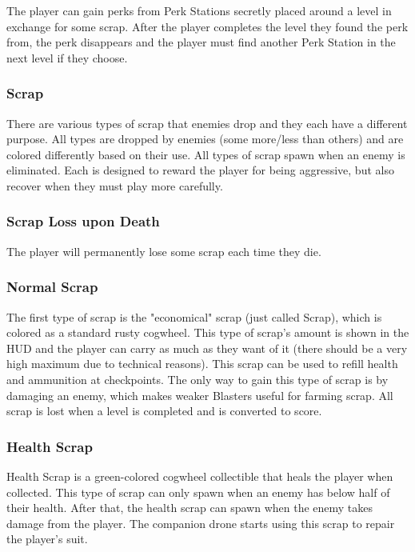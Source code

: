 \documentclass[12pt]{article}
\begin{document}
The player can gain perks from Perk Stations secretly placed around a level in exchange for some scrap. After the player completes the level they found the perk from, the perk disappears and the player must find another Perk Station in the next level if they choose. 

\subsubsection{Scrap}

There are various types of scrap that enemies drop and they each have a different purpose. All types are dropped by enemies (some more/less than others) and are colored differently based on their use. All types of scrap spawn when an enemy is eliminated. Each is designed to reward the player for being aggressive, but also recover when they must play more carefully. 

\subsubsection{Scrap Loss upon Death}

The player will permanently lose some scrap each time they die.

\subsubsection{Normal Scrap}

The first type of scrap is the "economical" scrap (just called Scrap), which is colored as a standard rusty cogwheel. This type of scrap's amount is shown in the HUD and the player can carry as much as they want of it (there should be a very high maximum due to technical reasons). This scrap can be used to refill health  and ammunition at checkpoints. %
The only way to gain this type of scrap is by damaging an enemy, which makes weaker Blasters useful for farming scrap. All scrap is lost when a level is completed and is converted to score. 

\subsubsection{Health Scrap}

Health Scrap is a green-colored cogwheel collectible that heals the player when collected. This type of scrap can only spawn when an enemy has below half of their health. After that, the health scrap can spawn when the enemy takes damage from the player. The companion drone starts using this scrap to repair the player's suit. 
\end{document}

